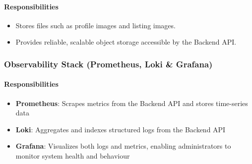 \paragraph{Responsibilities}
\begin{itemize}
    \item Stores files such as profile images and listing images.
    \item Provides reliable, scalable object storage accessible by the Backend API.
\end{itemize}

\subsubsection{Observability Stack (Prometheus, Loki \& Grafana)}

\paragraph{Responsibilities}
\begin{itemize}
    \item \textbf{Prometheus}: Scrapes metrics from the Backend API and stores time-series data
    \item \textbf{Loki}: Aggregates and indexes structured logs from the Backend API
    \item \textbf{Grafana}: Visualizes both logs and metrics, enabling administrators to monitor system health and behaviour
\end{itemize}
